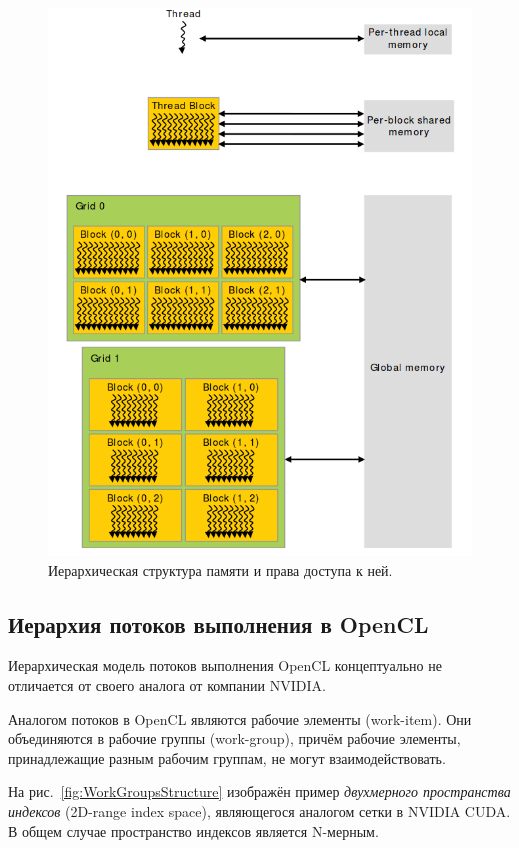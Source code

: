 \begin{figure}[p]
\centering
\includegraphics[width=1\textwidth]{include/graphics/image3}
\caption{Иерархическая структура памяти и права доступа к ней.}
\label{fig:MemoryStructure}
\end{figure}

\subsection{Иерархия потоков выполнения в OpenCL}

Иерархическая модель потоков выполнения OpenCL концептуально не отличается от 
своего аналога от компании NVIDIA.

Аналогом потоков в OpenCL являются рабочие элементы (work-item). Они
объединяются в рабочие группы (work-group), причём рабочие элементы, принадлежащие разным рабочим группам, не могут взаимодействовать.

На рис.~\ref{fig:WorkGroupsStructure} изображён пример \textit{двухмерного пространства индексов} (2D-range index space), являющегося аналогом сетки в NVIDIA CUDA. В общем случае пространство индексов является N-мерным.


